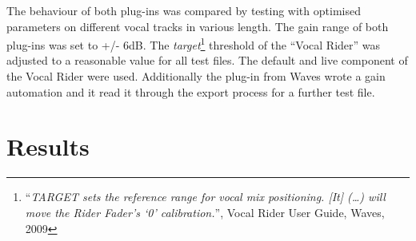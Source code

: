 The behaviour of both plug-ins was compared by testing with optimised parameters on different vocal tracks in various length. The gain range of both plug-ins was set to +/- 6dB. The \textit{target}\footnote{“\textit{TARGET sets the reference range for vocal mix positioning. [It] (…) will move the Rider Fader’s ‘0’ calibration.}”, Vocal Rider User Guide, Waves, 2009} threshold of the “Vocal Rider” was adjusted to a reasonable value for all test files. The default and live component of the Vocal Rider were used. Additionally the plug-in from Waves wrote a gain automation and it read it through the export process for a further test file.\\

\section{Results}

